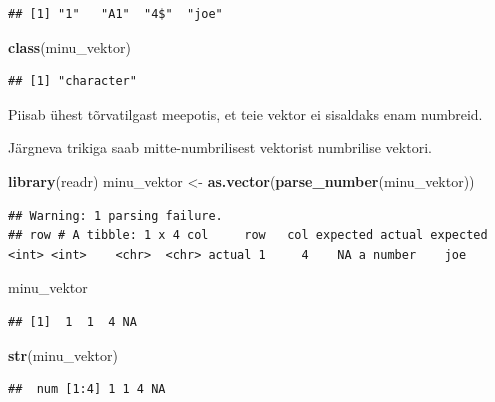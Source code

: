 \documentclass[]{book}
\newenvironment{Shaded}{\begin{snugshade}}{\end{snugshade}}
\newcommand{\KeywordTok}[1]{\textcolor[rgb]{0.13,0.29,0.53}{\textbf{#1}}}
\newcommand{\StringTok}[1]{\textcolor[rgb]{0.31,0.60,0.02}{#1}}
\newcommand{\NormalTok}[1]{#1}
\begin{document}
\begin{verbatim}
## [1] "1"   "A1"  "4$"  "joe"
\end{verbatim}

\begin{Shaded}
\begin{Highlighting}[]
\KeywordTok{class}\NormalTok{(minu_vektor)}
\end{Highlighting}
\end{Shaded}

\begin{verbatim}
## [1] "character"
\end{verbatim}

Piisab ühest tõrvatilgast meepotis, et teie vektor ei sisaldaks enam
numbreid.

Järgneva trikiga saab mitte-numbrilisest vektorist numbrilise vektori.

\begin{Shaded}
\begin{Highlighting}[]
\KeywordTok{library}\NormalTok{(readr)}
\NormalTok{minu_vektor <-}\StringTok{ }\KeywordTok{as.vector}\NormalTok{(}\KeywordTok{parse_number}\NormalTok{(minu_vektor))}
\end{Highlighting}
\end{Shaded}

\begin{verbatim}
## Warning: 1 parsing failure.
## row # A tibble: 1 x 4 col     row   col expected actual expected   <int> <int>    <chr>  <chr> actual 1     4    NA a number    joe
\end{verbatim}

\begin{Shaded}
\begin{Highlighting}[]
\NormalTok{minu_vektor}
\end{Highlighting}
\end{Shaded}

\begin{verbatim}
## [1]  1  1  4 NA
\end{verbatim}

\begin{Shaded}
\begin{Highlighting}[]
\KeywordTok{str}\NormalTok{(minu_vektor)}
\end{Highlighting}
\end{Shaded}

\begin{verbatim}
##  num [1:4] 1 1 4 NA
\end{verbatim}
\end{document}
